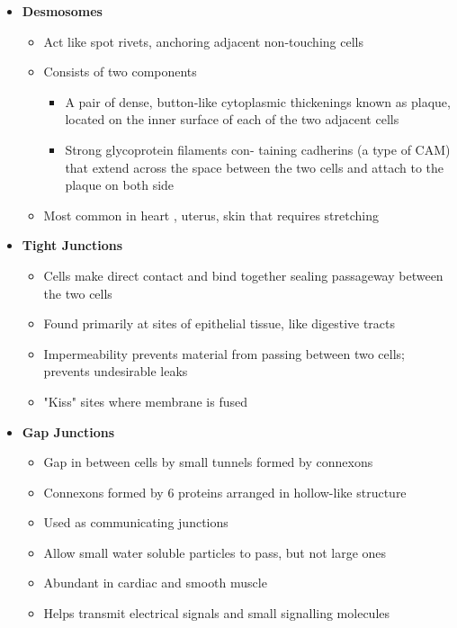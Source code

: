\documentclass[11pt]{article}
\begin{document}
\begin{itemize}

\item \textbf{Desmosomes}
\begin{itemize}
\item Act like spot rivets, anchoring adjacent non-touching cells 
\item Consists of two components 
\begin{itemize}
\item A pair of dense, button-like cytoplasmic thickenings known as plaque, located on the inner surface of each of the two adjacent cells
\item  Strong glycoprotein filaments con- taining cadherins (a type of CAM) that extend across the space between the two cells and attach to the plaque on both side
\end{itemize}
\item Most common in heart , uterus, skin that requires stretching
\end{itemize}

\item \textbf{Tight Junctions }
\begin{itemize}
\item Cells make direct contact and bind together sealing passageway between the two cells 
\item Found primarily at sites of epithelial tissue, like digestive tracts
\item Impermeability prevents material from passing between two cells; prevents undesirable leaks
\item "Kiss" sites where membrane is fused
\end{itemize}

\item \textbf{Gap Junctions}
\begin{itemize}
\item Gap in between cells by small tunnels formed by connexons
\item Connexons formed by 6 proteins arranged in hollow-like structure
\item Used as communicating junctions 
\item Allow small water soluble particles to pass, but not large ones
\item Abundant in cardiac and smooth muscle 
\item Helps transmit electrical signals and small signalling molecules 
\end{itemize}

\end{itemize}
\end{document}
